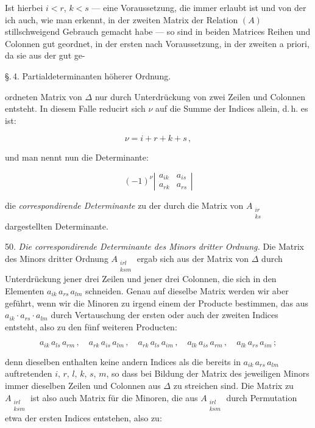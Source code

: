 Ist hierbei $i<r$, $k<s$ --- eine Voraussetzung, die immer erlaubt ist und von der ich auch, wie
man erkennt, in der zweiten Matrix der Relation $(A)$ stillschweigend Gebrauch gemacht habe ---
so sind in beiden Matrices Reihen und Colonnen gut geordnet, in der ersten nach Voraussetzung, in
der zweiten a priori, da sie aus der gut ge-


\S.\,4. Partialdeterminanten h\"oherer Ordnung.

ordneten Matrix von $\varDelta$ nur durch Unterdr\"uckung von zwei Zeilen und Colonnen entsteht.
In diesem Falle reducirt sich $\nu$ auf die Summe der Indices allein, d.\,h. es ist:

\[
\nu = i+r+k+s\,,
\]

und man nennt nun die Determinante:

\[
(-1)^\nu \left|\begin{array}{cc} a_{ik} & a_{is} \\ a_{rk} & a_{rs} \end{array}\right|
\]

die \textit{correspondirende Determinante} zu der durch die Matrix von $A_{\substack{ir\\ks}}$
dargestellten Determinante.

50. \textit{Die correspondirende Determinante des Minors dritter Ordnung.} Die Matrix des Minors
dritter Ordnung $A_{\substack{irl\\ksm}}$ ergab sich aus der Matrix von $\varDelta$ durch
Unterdr\"uckung jener drei Zeilen und jener drei Colonnen, die sich in den Elementen $a_{ik}\,
a_{rs}\,a_{lm}$ schneiden. Genau auf dieselbe Matrix werden wir aber gef\"uhrt, wenn wir die
Minoren zu irgend einem der Producte bestimmen, das aus $a_{ik}\cdot a_{rs}\cdot a_{lm}$ durch
Vertauschung der ersten oder auch der zweiten Indices entsteht, also zu den f\"unf weiteren
Producten:

\[
a_{ik}\,a_{ls}\,a_{rm}\,,\quad a_{rk}\,a_{is}\,a_{lm}\,,\quad a_{rk}\,a_{ls}\,a_{im}\,,\quad
a_{lk}\,a_{is}\,a_{rm}\,,\quad a_{lk}\,a_{rs}\,a_{im}\,;
\]

denn dieselben enthalten keine andern Indices als die bereits in $a_{ik}\,a_{rs}\,a_{lm}$
auftretenden $i,\,r,\,l,\,k,\,s,\,m$, so dass bei Bildung der Matrix des jeweiligen Minors immer
dieselben Zeilen und Colonnen aus $\varDelta$ zu streichen sind. Die Matrix zu
$A_{\substack{irl\\ksm}}$ ist also auch Matrix f\"ur die Minoren, die aus $A_{\substack{irl\\ksm}}$
durch Permutation etwa der ersten Indices entstehen, also zu:


